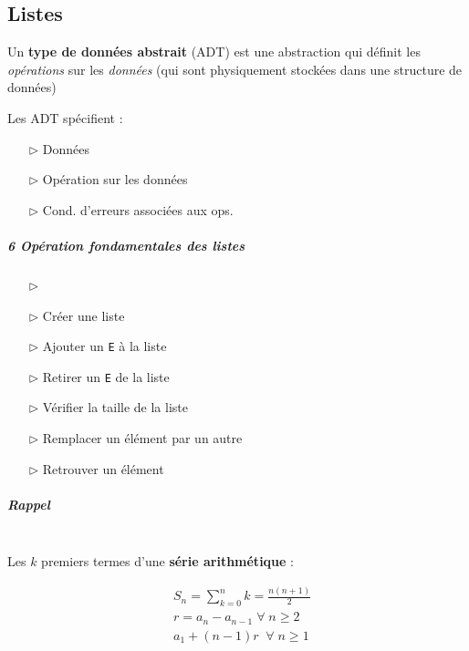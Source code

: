 \documentclass{report}
\begin{document}
    \begin{multicols*}{3}


  \chapter{Listes}

  \begin{Definitionx}{}{}
    Un \textbf{type de données abstrait} (ADT) est une abstraction qui définit les
    \textit{opérations} sur les \textit{données} 
    (qui sont physiquement stockées dans une
    structure de données)     
  \end{Definitionx}

  Les ADT spécifient :
  \begin{itemize}
    \item [$\rhd$ ] Données 
    \item [$\rhd$ ] Opération sur les données 
    \item [$\rhd$ ] Cond. d'erreurs associées aux ops. 
  \end{itemize}

  \paragraph{6 Opération fondamentales des listes}
  \begin{itemize}
    \item [$\rhd$ ]
    \item [$\rhd$ ] Créer une liste 
    \item [$\rhd$ ] Ajouter un \texttt{E} à la liste   
    \item [$\rhd$ ] Retirer un \texttt{E} de la liste  
    \item [$\rhd$ ] Vérifier la taille de la liste
    \item [$\rhd$ ] Remplacer un élément par un autre 
    \item [$\rhd$ ] Retrouver un élément 
  \end{itemize}

  \paragraph{Rappel}
  \mbox{}\\
  \noindent Les $k$ premiers termes d'une 
  \textbf{série arithmétique} :  

  \begin{align*}
        & S_n = \sum_{k=0}^{n } k = \frac{n(n+1)}{2} \\ 
        & r = a_n - a_{n-1} \; \forall \; n \geq 2 \\ 
        & a_1 + (n-1)r \;\; \forall \; n \geq 1 
  \end{align*}


\end{multicols*}
\end{document}
